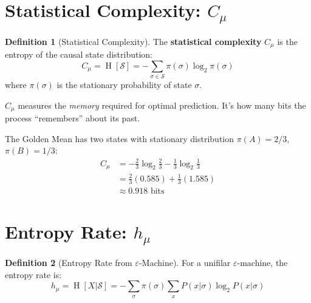 \documentclass[11pt,a4paper]{article}
\theoremstyle{definition}
\newtheorem{definition}{Definition}[section]
\theoremstyle{plain}
\newcommand{\eps}{\varepsilon}
\newcommand{\Cmu}{C_\mu}
\newcommand{\hmu}{h_\mu}
\newcommand{\calS}{\mathcal{S}}
\DeclareMathOperator{\Ent}{H}
\begin{document}
\section{Statistical Complexity: \texorpdfstring{$\Cmu$}{Cμ}}
\label{sec:cmu}

\begin{definition}[Statistical Complexity]
The \textbf{statistical complexity} $\Cmu$ is the entropy of the causal state distribution:
\begin{equation}
    \Cmu = \Ent[\calS] = -\sum_{\sigma \in \calS} \pi(\sigma) \log_2 \pi(\sigma)
\end{equation}
where $\pi(\sigma)$ is the stationary probability of state $\sigma$.
\end{definition}

\begin{intuition}
$\Cmu$ measures the \emph{memory} required for optimal prediction. It's how many bits the process ``remembers'' about its past.
\end{intuition}

\begin{example}[title=Computing $\Cmu$ for Golden Mean]
The Golden Mean has two states with stationary distribution $\pi(A) = 2/3$, $\pi(B) = 1/3$:
\begin{align*}
    \Cmu &= -\frac{2}{3} \log_2 \frac{2}{3} - \frac{1}{3} \log_2 \frac{1}{3} \\
    &= \frac{2}{3}(0.585) + \frac{1}{3}(1.585) \\
    &\approx 0.918 \text{ bits}
\end{align*}
\end{example}

\section{Entropy Rate: \texorpdfstring{$\hmu$}{hμ}}
\label{sec:hmu}

\begin{definition}[Entropy Rate from $\eps$-Machine]
For a unifilar $\eps$-machine, the entropy rate is:
\begin{equation}
    \hmu = \Ent[X | \calS] = -\sum_{\sigma} \pi(\sigma) \sum_{x} P(x|\sigma) \log_2 P(x|\sigma)
\end{equation}
\end{definition}
\end{document}
